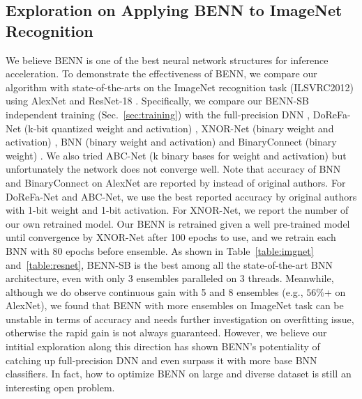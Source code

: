 \documentclass[10pt,twocolumn,letterpaper]{article}
\begin{document}
\subsection{Exploration on Applying BENN to ImageNet Recognition}
\label{sec:imagenet}
We believe BENN is one of the best neural network structures for inference acceleration. To demonstrate the effectiveness of BENN, we compare our algorithm with state-of-the-arts on the ImageNet recognition task (ILSVRC2012) using AlexNet \cite{krizhevsky2012imagenet} and ResNet-18 \cite{he2016deep}. Specifically, we compare our BENN-SB independent training (Sec.~\ref{sec:training}) with the full-precision DNN \cite{krizhevsky2012imagenet, rastegari2016xnor}, DoReFa-Net (k-bit quantized weight and activation) \cite{zhou2016dorefa}, XNOR-Net (binary weight and activation) \cite{rastegari2016xnor}, BNN (binary weight and activation) \cite{hubara2016binarized} and BinaryConnect (binary weight) \cite{courbariaux2015binaryconnect}. We also tried ABC-Net (k binary bases for weight and activation) \cite{lin2017towards} but unfortunately the network does not converge well. Note that accuracy of BNN and BinaryConnect on AlexNet are reported by \cite{rastegari2016xnor} instead of original authors. For DoReFa-Net and ABC-Net, we use the best reported accuracy by original authors with 1-bit weight and 1-bit activation. For XNOR-Net, we report the number of our own retrained model. Our BENN is retrained given a well pre-trained model until convergence by XNOR-Net after 100 epochs to use, and we retrain each BNN with 80 epochs before ensemble. As shown in Table~\ref{table:imgnet} and~\ref{table:resnet}, BENN-SB is the best among all the state-of-the-art BNN architecture, even with only 3 ensembles paralleled on 3 threads. Meanwhile, although we do observe continuous gain with 5 and 8 ensembles (e.g., $56\%$+ on AlexNet), we found that BENN with more ensembles on ImageNet task can be unstable in terms of accuracy and needs further investigation on overfitting issue, otherwise the rapid gain is not always guaranteed. However, we believe our intitial exploration along this direction has shown BENN's potentiality of catching up full-precision DNN and even surpass it with more base BNN classifiers. In fact, how to optimize BENN on large and diverse dataset is still an interesting open problem. 
\end{document}
